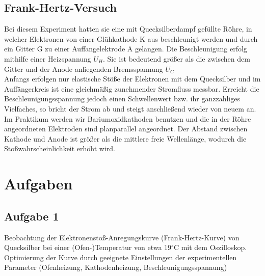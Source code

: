 \documentclass{article}
\begin{document}
{\subsection{Frank-Hertz-Versuch}
{\begin{center}
\begin{minipage}{\linewidth}
\centering
{}
%
\label{wtd}
\end{minipage}
\end{center}
Bei diesem Experiment hatten sie eine mit Quecksilberdampf gefüllte Röhre, in welcher Elektronen von einer Glühkathode K aus beschleunigt werden und durch ein Gitter G zu einer Auffangelektrode A gelangen. Die Beschleunigung erfolg mithilfe einer Heizspannung \(U_H\). Sie ist bedeutend größer als die zwischen dem Gitter und der Anode anliegenden Bremsspannung \(U_G\)\\
Anfangs erfolgen nur elastische Stöße der Elektronen mit dem Quecksilber und im Auffängerkreis ist eine gleichmäßig zunehmender Stromfluss messbar. Erreicht die Beschleunigungsspannung jedoch einen Schwellenwert bzw. ihr ganzzahliges Vielfaches, so bricht der Strom ab und steigt anschließend wieder von neuem an.\\
Im Praktikum werden wir Bariumoxidkathoden benutzen und die in der Röhre angeordneten Elektroden sind planparallel angeordnet. Der Abstand zwischen Kathode und Anode ist größer als die mittlere freie Wellenlänge, wodurch die Stoßwahrscheinlichkeit erhöht wird.

\section{Aufgaben}
\subsection*{Aufgabe 1}
Beobachtung der Elektronenstoß-Anregungskurve (Frank-Hertz-Kurve) von Quecksilber bei einer (Ofen-)Temperatur von etwa 19\(^\circ\)C mit dem Oszilloskop. Optimierung der Kurve durch geeignete Einstellungen der experimentellen Parameter (Ofenheizung, Kathodenheizung, Beschleunigungsspannung)

}}
\end{document}
